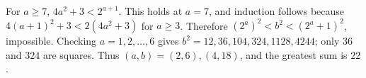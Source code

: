 For $a\ge7$, $4a^2+3<2^{a+1}$. This holds at $a=7$, and induction follows because $4(a+1)^2+3<2(4a^2+3)$ for $a\ge3$. Therefore $(2^a)^2<b^2<(2^a+1)^2$, impossible. Checking $a=1,2,\ldots,6$ gives $b^2=12,36,104,324,1128,4244$; only $36$ and $324$ are squares. Thus $(a,b)=(2,6),(4,18)$, and the greatest sum is $\boxed{22}$.
